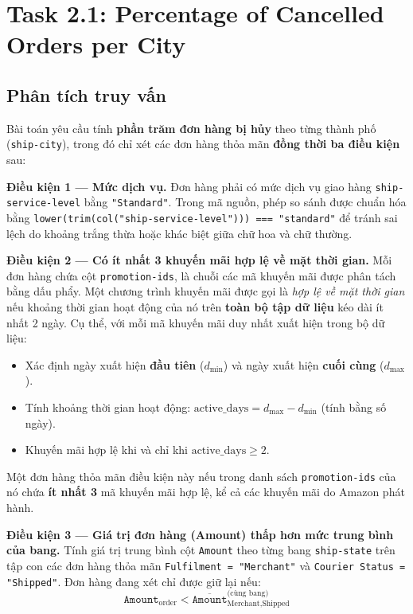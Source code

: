 \section{Task 2.1: Percentage of Cancelled Orders per City}

\subsection{Phân tích truy vấn}

Bài toán yêu cầu tính \textbf{phần trăm đơn hàng bị hủy} theo từng thành phố (\texttt{ship-city}), trong đó chỉ xét các đơn hàng thỏa mãn \textbf{đồng thời ba điều kiện} sau:

\textbf{Điều kiện 1 --- Mức dịch vụ.}
Đơn hàng phải có mức dịch vụ giao hàng \texttt{ship-service-level} bằng \texttt{"Standard"}. Trong mã nguồn, phép so sánh được chuẩn hóa bằng \texttt{lower(trim(col("ship-service-level"))) === "standard"} để tránh sai lệch do khoảng trắng thừa hoặc khác biệt giữa chữ hoa và chữ thường.

\textbf{Điều kiện 2 --- Có ít nhất 3 khuyến mãi hợp lệ về mặt thời gian.}
Mỗi đơn hàng chứa cột \texttt{promotion-ids}, là chuỗi các mã khuyến mãi được phân tách bằng dấu phẩy. Một chương trình khuyến mãi được gọi là \textit{hợp lệ về mặt thời gian} nếu khoảng thời gian hoạt động của nó trên \textbf{toàn bộ tập dữ liệu} kéo dài ít nhất 2 ngày. Cụ thể, với mỗi mã khuyến mãi duy nhất xuất hiện trong bộ dữ liệu:
\begin{itemize}
    \item Xác định ngày xuất hiện \textbf{đầu tiên} ($d_{\min}$) và ngày xuất hiện \textbf{cuối cùng} ($d_{\max}$).
    \item Tính khoảng thời gian hoạt động: $\text{active\_days} = d_{\max} - d_{\min}$ (tính bằng số ngày).
    \item Khuyến mãi hợp lệ khi và chỉ khi $\text{active\_days} \geq 2$.
\end{itemize}
Một đơn hàng thỏa mãn điều kiện này nếu trong danh sách \texttt{promotion-ids} của nó chứa \textbf{ít nhất 3} mã khuyến mãi hợp lệ, kể cả các khuyến mãi do Amazon phát hành.

\textbf{Điều kiện 3 --- Giá trị đơn hàng (Amount) thấp hơn mức trung bình của bang.}
Tính giá trị trung bình cột \texttt{Amount} theo từng bang \texttt{ship-state} trên tập con các đơn hàng thỏa mãn \texttt{Fulfilment = "Merchant"} và \texttt{Courier Status = "Shipped"}. Đơn hàng đang xét chỉ được giữ lại nếu:
\[
\texttt{Amount}_{\text{order}} < \overline{\texttt{Amount}}_{\text{Merchant,Shipped}}^{\text{(cùng bang)}}
\]

